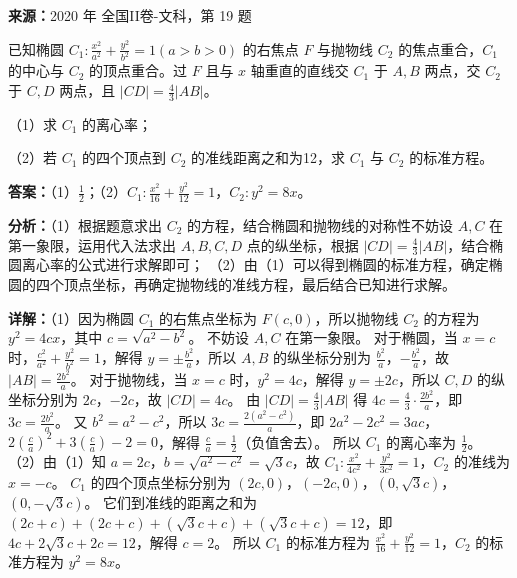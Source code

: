 \begin{question}[points=12]
\textbf{来源：}2020 年 全国II卷-文科，第 19 题\par
已知椭圆 $C_1:\frac{x^2}{a^2}+\frac{y^2}{b^2}=1(a>b>0)$ 的右焦点 $F$ 与抛物线 $C_2$ 的焦点重合，$C_1$ 的中心与 $C_2$ 的顶点重合。过 $F$ 且与 $x$ 轴重直的直线交 $C_1$ 于 $A,B$ 两点，交 $C_2$ 于 $C,D$ 两点，且 $|CD|=\frac{4}{3}|AB|$。

（1）求 $C_1$ 的离心率；

（2）若 $C_1$ 的四个顶点到 $C_2$ 的准线距离之和为12，求 $C_1$ 与 $C_2$ 的标准方程。
\begin{solution}
\textbf{答案：}（1）$\frac{1}{2}$；（2）$C_1:\frac{x^2}{16}+\frac{y^2}{12}=1$，$C_2:y^2=8x$。

\textbf{分析：}（1）根据题意求出 $C_2$ 的方程，结合椭圆和抛物线的对称性不妨设 $A,C$ 在第一象限，运用代入法求出 $A,B,C,D$ 点的纵坐标，根据 $|CD|=\frac{4}{3}|AB|$，结合椭圆离心率的公式进行求解即可；
（2）由（1）可以得到椭圆的标准方程，确定椭圆的四个顶点坐标，再确定抛物线的准线方程，最后结合已知进行求解。

\textbf{详解：}（1）因为椭圆 $C_1$ 的右焦点坐标为 $F(c,0)$，所以抛物线 $C_2$ 的方程为 $y^2=4cx$，其中 $c=\sqrt{a^2-b^2}$。
不妨设 $A,C$ 在第一象限。
对于椭圆，当 $x=c$ 时，$\frac{c^2}{a^2}+\frac{y^2}{b^2}=1$，解得 $y=\pm\frac{b^2}{a}$，所以 $A,B$ 的纵坐标分别为 $\frac{b^2}{a}$，$-\frac{b^2}{a}$，故 $|AB|=\frac{2b^2}{a}$。
对于抛物线，当 $x=c$ 时，$y^2=4c$，解得 $y=\pm2c$，所以 $C,D$ 的纵坐标分别为 $2c$，$-2c$，故 $|CD|=4c$。
由 $|CD|=\frac{4}{3}|AB|$ 得 $4c=\frac{4}{3}\cdot\frac{2b^2}{a}$，即 $3c=\frac{2b^2}{a}$。
又 $b^2=a^2-c^2$，所以 $3c=\frac{2(a^2-c^2)}{a}$，即 $2a^2-2c^2=3ac$，$2\left(\frac{c}{a}\right)^2+3\left(\frac{c}{a}\right)-2=0$，解得 $\frac{c}{a}=\frac{1}{2}$（负值舍去）。
所以 $C_1$ 的离心率为 $\frac{1}{2}$。
（2）由（1）知 $a=2c$，$b=\sqrt{a^2-c^2}=\sqrt{3}c$，故 $C_1:\frac{x^2}{4c^2}+\frac{y^2}{3c^2}=1$，$C_2$ 的准线为 $x=-c$。
$C_1$ 的四个顶点坐标分别为 $(2c,0)$，$(-2c,0)$，$(0,\sqrt{3}c)$，$(0,-\sqrt{3}c)$。
它们到准线的距离之和为 $(2c+c)+(2c+c)+(\sqrt{3}c+c)+(\sqrt{3}c+c)=12$，即 $4c+2\sqrt{3}c+2c=12$，解得 $c=2$。
所以 $C_1$ 的标准方程为 $\frac{x^2}{16}+\frac{y^2}{12}=1$，$C_2$ 的标准方程为 $y^2=8x$。
\end{solution}
\end{question}

